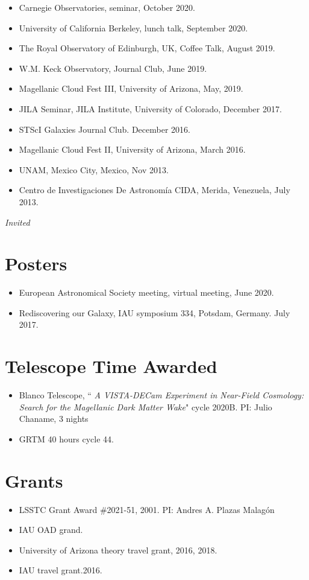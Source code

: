 \documentclass[UTF8]{article}
\begin{document}
\begin{itemize}
\item Carnegie Observatories, seminar, October 2020. \dag
\item University of California Berkeley, lunch talk, September 2020. 
\item The Royal Observatory of Edinburgh, UK, Coffee Talk, August 2019. \dag
\item W.M. Keck Observatory, Journal Club, June 2019.
\item Magellanic Cloud Fest III, University of Arizona, May, 2019.
\item JILA Seminar, JILA Institute, University of Colorado, December 2017.
\item STScI Galaxies Journal Club. December 2016.
\item Magellanic Cloud Fest II, University of Arizona, March 2016.
\item UNAM, Mexico City, Mexico, Nov 2013. 
\item Centro de Investigaciones De Astronom\'ia CIDA, Merida, Venezuela, July 2013.
\end{itemize}
\indent \dag \textit{Invited}

\section*{Posters}
\begin{itemize}
\setlength\itemsep{0.0em}
\renewcommand\labelitemi{$\cdot$}
  \item European Astronomical Society meeting, virtual meeting, June 2020.
  \item Rediscovering our Galaxy, IAU symposium 334, Potsdam, Germany. July 2017.
\end{itemize}

\section*{Telescope Time Awarded}
\begin{itemize}
  \setlength\itemsep{0.0em}
  \renewcommand\labelitemi{$\cdot$}
\item Blanco Telescope, ``\textit{ A VISTA-DECam Experiment in Near-Field
  Cosmology: Search for the Magellanic Dark Matter Wake}" cycle 2020B. PI: Julio Chaname, 3 nights
  \item GRTM 40 hours cycle 44. 
\end{itemize}


\section*{Grants}
\begin{itemize}
\setlength\itemsep{0.0em}
\renewcommand\labelitemi{$\cdot$}
\item LSSTC Grant Award \#2021-51, 2001. PI: Andres A. Plazas Malag\'on
\item IAU OAD grand.
\item University of Arizona theory travel grant, 2016, 2018. 
\item IAU travel grant.2016.
\end{itemize}
\end{document}
